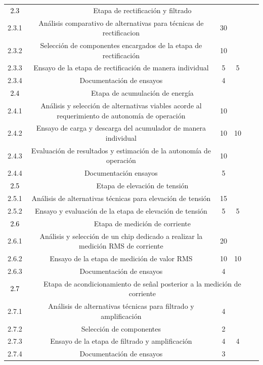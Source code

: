 \documentclass[11pt]{charter}
\begin{document}
\begin{table}[H]
{\begin{tabular}{|c|c|c|c|c|c|}
	
			\rowcolor[HTML]{A232ED} 
			\textcolor{black}{2.3} & \multicolumn{5}{|c|}{Etapa de rectificación y filtrado} \\ \cline{1-6}
			2.3.1 & Análisis comparativo de alternativas para técnicas de rectificacion & 30 &  &  &  \\ \hline
			2.3.2 & Selección de componentes encargados de la etapa de rectificación & 10 &  &  &  \\ \hline
			2.3.3 & Ensayo de la etapa de rectificación de manera individual & 5 & 5 &  &  \\ \hline
			2.3.4 & Documentación de ensayos & 4 &  &  &  \\ \hline
	
			
			\rowcolor[HTML]{F7F42A} 
			\textcolor{black}{2.4} & \multicolumn{5}{|c|}{Etapa de acumulación de energía} \\ 	\cline{1-6}
			2.4.1 & Análisis y selección de alternativas viables acorde al requerimiento de autonomía de operación & 10 &  &  &  \\ \hline
			2.4.2 & Ensayo de carga y descarga del acumulador de manera individual & 10 & 10 &  &  \\ \hline
			2.4.3 & Evaluación de resultados y estimación de la autonomía de operación & 10 &  &  &  \\ \hline
			2.4.4 & Documentación ensayos & 5 &  &  &  \\ \hline		
			
			\rowcolor[HTML]{99F285} 
			\textcolor{black}{2.5} & \multicolumn{5}{|c|}{Etapa de elevación de tensión} \\ \cline{1-6}
			2.5.1 & Análisis de alternativas técnicas para elevación de tensión & 15 &  &  &  \\ \hline   
			2.5.2 & Ensayo y evaluación de la etapa de elevación de tensión & 5 & 5 &  &  \\ \hline 		
			
			
			\rowcolor[HTML]{FBFF00} 
			\textcolor{black}{2.6}& \multicolumn{5}{|c|}{Etapa de medición de corriente} \\ \cline{1-6}		
			2.6.1 & Análisis y selección de un chip dedicado a realizar la medición RMS de corriente & 20 &  &  &  \\ \hline
			2.6.2 & Ensayo de la etapa de medición de valor RMS & 10 & 10 &  &  \\ \hline   
			2.6.3 & Documentación de ensayos & 4 &  &  &  \\ \hline
		
			
			\rowcolor[HTML]{FF3650} 
			\textcolor{black}{2.7}& \multicolumn{5}{|c|}{Etapa de acondicionamiento de señal posterior a la medición de corriente} \\ \cline{1-6}		
			2.7.1 & Análisis de alternativas técnicas para filtrado y amplificación & 4 &  &  &  \\ \hline
			2.7.2 & Selección de componentes & 2 &  &  &  \\ \hline   
			2.7.3 & Ensayo de la etapa de filtrado y amplificación & 4 & 4 &  &  \\ \hline   
			2.7.4 & Documentación de ensayos & 3 &  &  &  \\ \hline
	

\end{tabular}}
\end{table}
\end{document}
